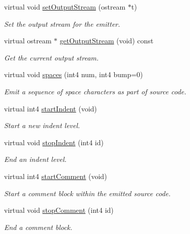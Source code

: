 \begin{DoxyCompactItemize}
virtual void \mbox{\hyperlink{class_emit_xml_a92a27602a190342a8f055fdcc178f5b9}{set\+Output\+Stream}} (ostream $\ast$t)
\begin{DoxyCompactList}\small\item\em Set the output stream for the emitter. \end{DoxyCompactList}\item 
virtual ostream $\ast$ \mbox{\hyperlink{class_emit_xml_a1190216f59dd61157699a2ee4f2f4b29}{get\+Output\+Stream}} (void) const
\begin{DoxyCompactList}\small\item\em Get the current output stream. \end{DoxyCompactList}\item 
virtual void \mbox{\hyperlink{class_emit_xml_ab2e3fc4934aade587c0b5a8706c9dfa0}{spaces}} (int4 num, int4 bump=0)
\begin{DoxyCompactList}\small\item\em Emit a sequence of space characters as part of source code. \end{DoxyCompactList}\item 
virtual int4 \mbox{\hyperlink{class_emit_xml_ae9ed06a8d8049b22634eb06799d3ec3d}{start\+Indent}} (void)
\begin{DoxyCompactList}\small\item\em Start a new indent level. \end{DoxyCompactList}\item 
virtual void \mbox{\hyperlink{class_emit_xml_a87ee3be19fea009ca1191a252a7c91ce}{stop\+Indent}} (int4 id)
\begin{DoxyCompactList}\small\item\em End an indent level. \end{DoxyCompactList}\item 
virtual int4 \mbox{\hyperlink{class_emit_xml_a4b5198be36bbd5b170206affef1d21d0}{start\+Comment}} (void)
\begin{DoxyCompactList}\small\item\em Start a comment block within the emitted source code. \end{DoxyCompactList}\item 
virtual void \mbox{\hyperlink{class_emit_xml_abd12549a4f041d4358064a452ded5301}{stop\+Comment}} (int4 id)
\begin{DoxyCompactList}\small\item\em End a comment block. \end{DoxyCompactList}\item 

\end{DoxyCompactItemize}
